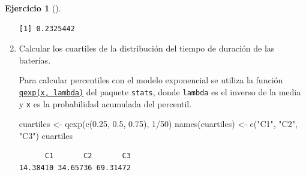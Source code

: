 \documentclass[
  a4paper,
]{scrreport}
\newenvironment{Shaded}{\begin{snugshade}}{\end{snugshade}}
\newcommand{\DecValTok}[1]{\textcolor[rgb]{0.68,0.00,0.00}{#1}}
\newcommand{\FloatTok}[1]{\textcolor[rgb]{0.68,0.00,0.00}{#1}}
\newcommand{\FunctionTok}[1]{\textcolor[rgb]{0.28,0.35,0.67}{#1}}
\newcommand{\NormalTok}[1]{\textcolor[rgb]{0.00,0.23,0.31}{#1}}
\newcommand{\OtherTok}[1]{\textcolor[rgb]{0.00,0.23,0.31}{#1}}
\newcommand{\SpecialCharTok}[1]{\textcolor[rgb]{0.37,0.37,0.37}{#1}}
\newcommand{\StringTok}[1]{\textcolor[rgb]{0.13,0.47,0.30}{#1}}
\theoremstyle{definition}
\newtheorem{exercise}{Ejercicio}[chapter]
\theoremstyle{remark}
\begin{document}
\begin{exercise}[]
\begin{enumerate}
\begin{tcolorbox}
\begin{verbatim}
[1] 0.2325442
\end{verbatim}

  \end{tcolorbox}
\item
  Calcular los cuartiles de la distribución del tiempo de duración de
  las baterías.

  \begin{tcolorbox}[enhanced jigsaw, toprule=.15mm, rightrule=.15mm, arc=.35mm, colback=white, colbacktitle=quarto-callout-tip-color!10!white, toptitle=1mm, left=2mm, colframe=quarto-callout-tip-color-frame, opacityback=0, breakable, opacitybacktitle=0.6, bottomtitle=1mm, titlerule=0mm, title=\textcolor{quarto-callout-tip-color}{\faLightbulb}\hspace{0.5em}{Solución}, bottomrule=.15mm, coltitle=black, leftrule=.75mm]

  Para calcular percentiles con el modelo exponencial se utiliza la
  función
  \href{https://www.rdocumentation.org/packages/stats/versions/3.3/topics/Exponential}{\texttt{qexp(x,\ lambda)}}
  del paquete \texttt{stats}, donde \texttt{lambda} es el inverso de la
  media y \texttt{x} es la probabilidad acumulada del percentil.

\begin{Shaded}
\begin{Highlighting}[]
\NormalTok{cuartiles }\OtherTok{\textless{}{-}} \FunctionTok{qexp}\NormalTok{(}\FunctionTok{c}\NormalTok{(}\FloatTok{0.25}\NormalTok{, }\FloatTok{0.5}\NormalTok{, }\FloatTok{0.75}\NormalTok{), }\DecValTok{1}\SpecialCharTok{/}\DecValTok{50}\NormalTok{)}
\FunctionTok{names}\NormalTok{(cuartiles) }\OtherTok{\textless{}{-}} \FunctionTok{c}\NormalTok{(}\StringTok{"C1"}\NormalTok{, }\StringTok{"C2"}\NormalTok{, }\StringTok{"C3"}\NormalTok{)}
\NormalTok{cuartiles}
\end{Highlighting}
\end{Shaded}

\begin{verbatim}
      C1       C2       C3 
14.38410 34.65736 69.31472 
\end{verbatim}

  \end{tcolorbox}
\end{enumerate}

\end{exercise}
\end{document}
